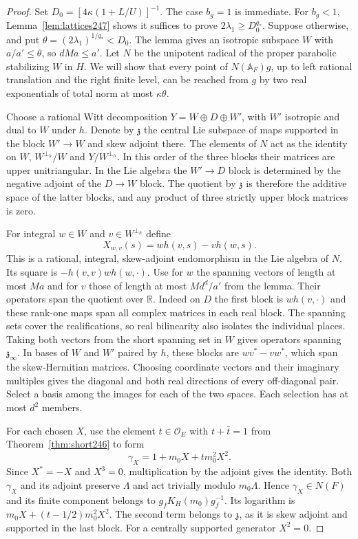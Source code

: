 \documentclass[a4paper,11pt]{article}
\theoremstyle{definition}
\theoremstyle{remark}
\numberwithin{equation}{section}
\begin{document}
\begin{proof}
Set \(D_0=[4\kappa(1+L/U)]^{-1}\). The case \(b_g=1\) is immediate.
For \(b_g<1\), Lemma~\ref{lem:lattices247} shows it suffices to prove
\(2\lambda_1\ge D_0^{q_*}\). Suppose otherwise, and put
\(\theta=(2\lambda_1)^{1/q_*}<D_0\). The lemma gives an isotropic
subspace \(W\) with \(a/a'\le\theta\), so \(dMa\le a'\). Let \(N\)
be the unipotent radical of the proper parabolic stabilizing \(W\) in
\(H\). We will show that every point of \(N(\mathbb A_F)g\), up to
left rational translation and the right finite level, can be reached
from \(g\) by two real exponentials of total norm at most
\(\kappa\theta\).

Choose a rational Witt decomposition \(Y=W\oplus D\oplus W'\), with
\(W'\) isotropic and dual to \(W\) under \(h\). Denote by
\(\mathfrak z\) the central Lie subspace of maps supported in the
block \(W'\to W\) and skew adjoint there. The elements of \(N\) act
as the identity on \(W\), \(W^{\perp_h}/W\) and \(Y/W^{\perp_h}\).
In this order of the three blocks their matrices are upper unitriangular.
In the Lie algebra the \(W'\to D\) block is determined by the negative
adjoint of the \(D\to W\) block. The quotient by \(\mathfrak z\) is
therefore the additive space of the latter blocks, and any product of
three strictly upper block matrices is zero.

For integral \(w\in W\) and \(v\in W^{\perp_h}\) define
\[
          X_{w,v}(s)=w h(v,s)-v h(w,s).
\]
This is a rational, integral, skew-adjoint endomorphism in the Lie
algebra of \(N\). Its square is \(-h(v,v)w h(w,\cdot)\).
Use for \(w\) the spanning vectors of length at most \(Ma\) and for
\(v\) those of length at most \(Md^d/a'\) from the lemma. Their
operators span the quotient over \(\mathbb R\). Indeed on \(D\) the
first block is \(w h(v,\cdot)\) and these rank-one maps span all
complex matrices in each real block. The spanning sets cover the
realifications, so real bilinearity also isolates the individual
places. Taking both vectors from the short spanning set in \(W\)
gives operators spanning \(\mathfrak z_\infty\). In bases of \(W\)
and \(W'\) paired by \(h\), these blocks are \(w v^*-v w^*\), which
span the skew-Hermitian matrices. Choosing coordinate vectors and
their imaginary multiples gives the diagonal and both real directions
of every off-diagonal pair. Select a basis among the images for each
of the two spaces. Each selection has at most \(d^2\) members.

For each chosen \(X\), use the element \(t\in\mathcal O_E\) with
\(t+\bar t=1\) from Theorem~\ref{thm:short246} to form
\[
           \gamma_X=1+m_0X+t m_0^2 X^2 .
\]
Since \(X^*=-X\) and \(X^3=0\), multiplication by the adjoint gives
the identity. Both \(\gamma_X\) and its adjoint preserve \(\Lambda\)
and act trivially modulo \(m_0\Lambda\). Hence \(\gamma_X\in N(F)\)
and its finite component belongs to \(g_f K_H(m_0)g_f^{-1}\).
Its logarithm is \(m_0X+(t-1/2)m_0^2X^2\). The second term belongs
to \(\mathfrak z\), as it is skew adjoint and supported in the last
block. For a centrally supported generator \(X^2=0\).


\end{proof}
\end{document}
